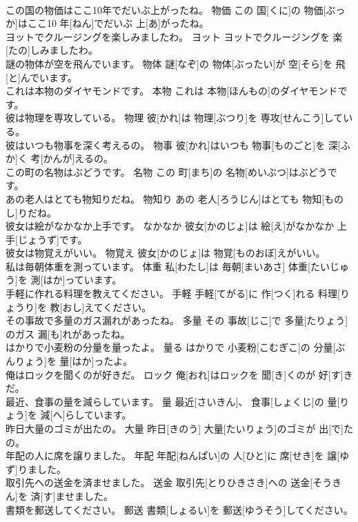 \documentclass[8pt]{extreport}
\begin{document}
\begin{CJK}{UTF8}{min}
\\	この国の物価はここ10年でだいぶ上がったね。	物価	この 国[くに]の 物価[ぶっか]はここ10 年[ねん]でだいぶ 上[あ]がったね。	
\\	ヨットでクルージングを楽しみましたわ。	ヨット	ヨットでクルージングを 楽[たの]しみましたわ。	
\\	謎の物体が空を飛んでいます。	物体	謎[なぞ]の 物体[ぶったい]が 空[そら]を 飛[と]んでいます。	
\\	これは本物のダイヤモンドです。	本物	これは 本物[ほんもの]のダイヤモンドです。	
\\	彼は物理を専攻している。	物理	彼[かれ]は 物理[ぶつり]を 専攻[せんこう]している。	
\\	彼はいつも物事を深く考えるの。	物事	彼[かれ]はいつも 物事[ものごと]を 深[ふか]く 考[かんが]えるの。	
\\	この町の名物はぶどうです。	名物	この 町[まち]の 名物[めいぶつ]はぶどうです。	
\\	あの老人はとても物知りだね。	物知り	あの 老人[ろうじん]はとても 物知[ものし]りだね。	
\\	彼女は絵がなかなか上手です。	なかなか	彼女[かのじょ]は 絵[え]がなかなか 上手[じょうず]です。	
\\	彼女は物覚えがいい。	物覚え	彼女[かのじょ]は 物覚[ものおぼ]えがいい。	
\\	私は毎朝体重を測っています。	体重	私[わたし]は 毎朝[まいあさ] 体重[たいじゅう]を 測[はか]っています。	
\\	手軽に作れる料理を教えてください。	手軽	手軽[てがる]に 作[つく]れる 料理[りょうり]を 教[おし]えてください。	
\\	その事故で多量のガス漏れがあったね。	多量	その 事故[じこ]で 多量[たりょう]のガス 漏[も]れがあったね。	
\\	はかりで小麦粉の分量を量ったよ。	量る	はかりで 小麦粉[こむぎこ]の 分量[ぶんりょう]を 量[はか]ったよ。	
\\	俺はロックを聞くのが好きだ。	ロック	俺[おれ]はロックを 聞[き]くのが 好[す]きだ。	
\\	最近、食事の量を減らしています。	量	最近[さいきん]、 食事[しょくじ]の 量[りょう]を 減[へ]らしています。	
\\	昨日大量のゴミが出たの。	大量	昨日[きのう] 大量[たいりょう]のゴミが 出[で]たの。	
\\	年配の人に席を譲りました。	年配	年配[ねんぱい]の 人[ひと]に 席[せき]を 譲[ゆず]りました。	
\\	取引先への送金を済ませました。	送金	取引先[とりひきさき]への 送金[そうきん]を 済[す]ませました。	
\\	書類を郵送してください。	郵送	書類[しょるい]を 郵送[ゆうそう]してください。	

\end{CJK}
\end{document}

